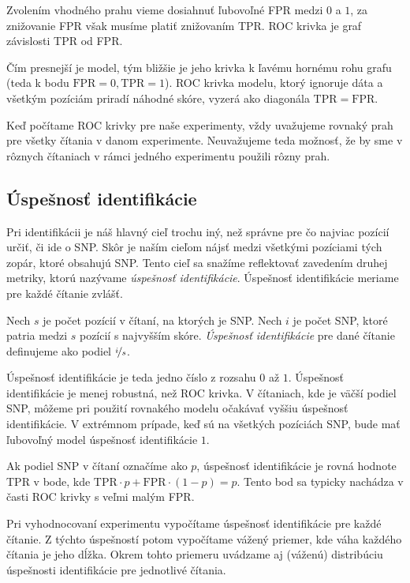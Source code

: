 Zvolením vhodného prahu vieme dosiahnuť ľubovoľné FPR medzi $0$ a $1$, za znižovanie FPR však musíme
platiť znižovaním TPR. ROC krivka je graf závislosti TPR od FPR. 


Čím presnejší je model, tým bližšie je jeho krivka k ľavému hornému rohu grafu (teda k bodu $
\mathrm{FPR} = 0, \mathrm{TPR} = 1$).
ROC krivka modelu, ktorý ignoruje dáta a všetkým pozíciám priradí náhodné skóre, vyzerá ako diagonála
$\mathrm{TPR} = \mathrm{FPR}$.

Keď počítame ROC krivky pre naše experimenty, vždy uvažujeme rovnaký prah pre všetky čítania v danom 
experimente. Neuvažujeme teda možnosť, že by sme v rôznych čítaniach v rámci jedného experimentu použili 
rôzny prah.

\subsection{Úspešnosť identifikácie}

Pri identifikácii je náš hlavný cieľ trochu iný, než správne pre čo najviac pozícií určiť, či ide o SNP. Skôr
je naším cieľom nájsť medzi všetkými pozíciami tých zopár, ktoré obsahujú SNP. Tento cieľ sa snažíme 
reflektovať zavedením druhej metriky, ktorú nazývame \emph{úspešnosť identifikácie}. Úspešnosť identifikácie
meriame pre každé čítanie zvlášť.

\begin{definicia}
Nech $s$ je počet pozícií v čítaní, na ktorých je  SNP. Nech $i$ je počet SNP, ktoré patria medzi $s$ pozícií
s najvyšším skóre. \emph{Úspešnosť identifikácie} pre dané čítanie definujeme ako podiel $\nicefrac{i}{s}$.
\end{definicia}

Úspešnosť identifikácie je teda jedno číslo z rozsahu $0$ až $1$. Úspešnosť identifikácie je menej robustná,
než ROC krivka. V čítaniach, kde je väčší podiel SNP, môžeme pri použití rovnakého modelu očakávať vyššiu úspešnosť identifikácie.
V extrémnom prípade, keď sú na všetkých pozíciách SNP, bude mať ľubovoľný model úspešnosť identifikácie $1$.

Ak podiel SNP v čítaní označíme ako $p$, úspešnosť identifikácie je rovná hodnote TPR v bode, 
kde $\mathrm{TPR} \cdot p + \mathrm{FPR} \cdot (1-p) = p$. Tento bod sa typicky nachádza v časti ROC krivky s
veľmi malým FPR.

Pri vyhodnocovaní experimentu vypočítame úspešnosť identifikácie pre každé čítanie. Z týchto úspešností potom vypočítame
vážený priemer, kde váha každého čítania je jeho dĺžka. Okrem tohto priemeru uvádzame aj (váženú) distribúciu 
úspešnosti identifikácie pre jednotlivé čítania.


